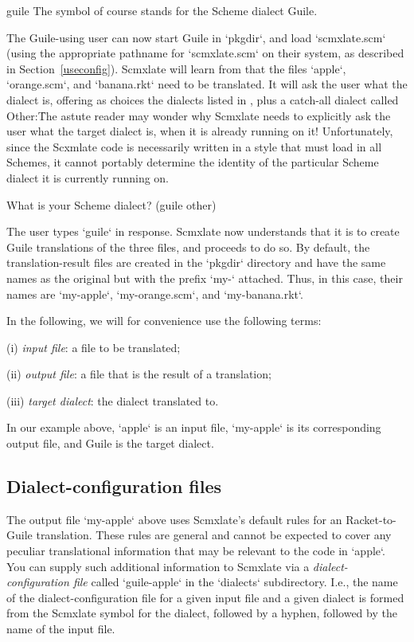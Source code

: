 \begintts
guile
\endtt
The symbol  of course stands for the Scheme
dialect Guile.

The Guile-using user can now start Guile in `pkgdir`,
and load `scmxlate.scm` (using the appropriate
pathname for `scmxlate.scm` on their system, as
described in Section~\ref{useconfig}).  Scmxlate will learn
from  that the files
`apple`, `orange.scm`, and `banana.rkt` need to be
translated.  It will ask the user what the dialect is,
offering as choices the dialects listed in
, plus a catch-all
dialect called Other:\f{The astute reader may wonder
why Scmxlate needs to explicitly ask the user what the
target dialect is, when it is already running on it!
Unfortunately, since the Scxmlate code is necessarily
written in a style that must load in all Schemes, it
cannot portably determine the identity of the
particular Scheme dialect it is currently running on.}

\begintt
What is your Scheme dialect?
     (guile other)
\endtt

The user types `guile` in response.  Scmxlate now
understands that it is to create Guile translations of
the three files, and proceeds to do so.  By default,
the translation-result files are created in the
`pkgdir` directory and have the same names as the
original but with the prefix `my-` attached.  Thus,
in this case, their names are `my-apple`,
`my-orange.scm`, and `my-banana.rkt`.

In the following, we will for convenience use
the following terms:

(i) {\em input file}: a file to be translated;

(ii) {\em output file}: a file that is the result of
a translation;

(iii) {\em target dialect}: the dialect translated to.

In our example above, `apple` is an input
file, `my-apple` is its corresponding output file,
and Guile is the target dialect.

\subsection{Dialect-configuration files}

The output  file `my-apple` above uses Scmxlate’s
default rules for an Racket-to-Guile translation.
These rules are general and cannot be expected to cover
any peculiar translational information that may be
relevant to the code in `apple`.  You can supply such
additional information to Scmxlate via a {\em
dialect-configuration file} called `guile-apple` in
the `dialects` subdirectory.   I.e., the name of
the dialect-configuration file for a given input file
and a given dialect is formed from  the Scmxlate symbol
for the dialect, followed by a hyphen, followed by the
name of the input file.

